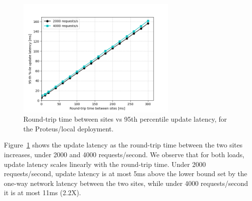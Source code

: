 \begin{figure}[H]
\centering
  \includegraphics[width=0.7\textwidth]{./figures/evaluation/fr_latency_net_latency.png}
  \caption{Round-trip time between sites vs 95th percentile update latency, for the Proteus/local deployment.}
  \label{fig:fr_latency_net_latency}
\end{figure}

Figure~\ref{fig:fr_latency_net_latency} shows the update latency as the round-trip time between the two sites increases,
under 2000 and 4000 requests/second.
We observe that for both loads, update latency scales linearly with the round-trip time.
Under 2000 requests/second, update latency is at most 5ms above the lower bound set by the one-way network latency
between the two sites, while under 4000 requests/second it is at most 11ms (2.2X).

